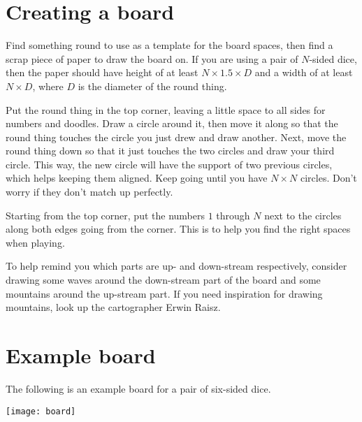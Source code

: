 \label{ch:board}
\section{Creating a board}
Find something round to use as a template for the board spaces, then find a
scrap piece of paper to draw the board on. If you are using a pair of $N$-sided
dice, then the paper should have height of at least $N \times 1.5 \times D$ and
a width of at least $N \times D$, where $D$ is the diameter of the round thing.

Put the round thing in the top corner, leaving a little space to all sides
for numbers and doodles. Draw a circle around it, then move it along so that
the round thing touches the circle you just drew and draw another. Next,
move the round thing down so that it just touches the two circles and draw your
third circle. This way, the new circle will have the support of two previous
circles, which helps keeping them aligned. Keep going until you have $N \times
N$ circles. Don't worry if they don't match up perfectly.

Starting from the top corner, put the numbers $1$ through $N$ next to the
circles along both edges going from the corner. This is to help you find the
right spaces when playing.

To help remind you which parts are up- and down-stream respectively, consider
drawing some waves around the down-stream part of the board and some mountains
around the up-stream part. If you need inspiration for drawing mountains, look
up the cartographer Erwin Raisz.


\section{Example board}
\label{sec:example_board}
The following is an example board for a pair of six-sided dice.
\begin{center}
    \texttt{[image: board]}
\end{center}
